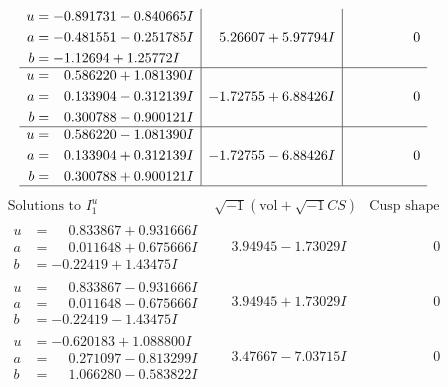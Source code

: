 \documentclass[1p]{elsarticle_modified}
\theoremstyle{definition}
\newcommand{\I}{\sqrt{-1}}
\begin{document}
$$\begin{array}{c|c|c}
\begin{aligned}
u &= -0.891731 - 0.840665 I \\
a &= -0.481551 - 0.251785 I \\
b &= -1.12694 + 1.25772 I\end{aligned}
 & \phantom{-}5.26607 + 5.97794 I & \phantom{-0.000000 } 0 \\ \hline\begin{aligned}
u &= \phantom{-}0.586220 + 1.081390 I \\
a &= \phantom{-}0.133904 - 0.312139 I \\
b &= \phantom{-}0.300788 - 0.900121 I\end{aligned}
 & -1.72755 + 6.88426 I & \phantom{-0.000000 } 0 \\ \hline\begin{aligned}
u &= \phantom{-}0.586220 - 1.081390 I \\
a &= \phantom{-}0.133904 + 0.312139 I \\
b &= \phantom{-}0.300788 + 0.900121 I\end{aligned}
 & -1.72755 - 6.88426 I & \phantom{-0.000000 } 0\\
 \hline 
 \end{array}$$\newpage$$\begin{array}{c|c|c}  
\text{Solutions to }I^u_{1}& \I (\text{vol} + \sqrt{-1}CS) & \text{Cusp shape}\\
 \hline 
\begin{aligned}
u &= \phantom{-}0.833867 + 0.931666 I \\
a &= \phantom{-}0.011648 + 0.675666 I \\
b &= -0.22419 + 1.43475 I\end{aligned}
 & \phantom{-}3.94945 - 1.73029 I & \phantom{-0.000000 } 0 \\ \hline\begin{aligned}
u &= \phantom{-}0.833867 - 0.931666 I \\
a &= \phantom{-}0.011648 - 0.675666 I \\
b &= -0.22419 - 1.43475 I\end{aligned}
 & \phantom{-}3.94945 + 1.73029 I & \phantom{-0.000000 } 0 \\ \hline\begin{aligned}
u &= -0.620183 + 1.088800 I \\
a &= \phantom{-}0.271097 - 0.813299 I \\
b &= \phantom{-}1.066280 - 0.583822 I\end{aligned}
 & \phantom{-}3.47667 - 7.03715 I & \phantom{-0.000000 } 0 \\ \hline\begin{aligned}

\end{aligned}
\end{array}$$
\end{document}

